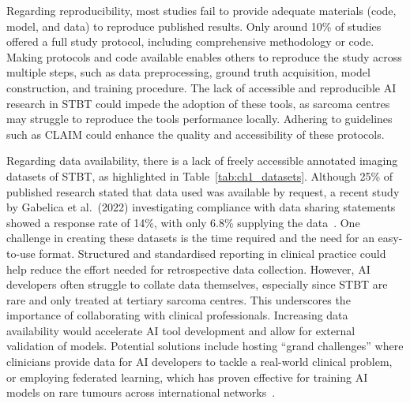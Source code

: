 Regarding reproducibility, most studies fail to provide adequate materials (code, model, and data) to reproduce published results.
Only around 10\% of studies offered a full study protocol, including comprehensive methodology or code.
Making protocols and code available enables others to reproduce the study across multiple steps, such as data preprocessing, ground truth acquisition, model construction, and training procedure.
The lack of accessible and reproducible AI research in STBT could impede the adoption of these tools, as sarcoma centres may struggle to reproduce the tools performance locally.
Adhering to guidelines such as CLAIM could enhance the quality and accessibility of these protocols.

Regarding data availability, there is a lack of freely accessible annotated imaging datasets of STBT, as highlighted in Table~\ref{tab:ch1_datasets}.
Although 25\% of published research stated that data used was available by request, a recent study by Gabelica et al.\ (2022) investigating compliance with data sharing statements showed a response rate of 14\%, with only 6.8\% supplying the data~\autocite{gabelica2022}.
One challenge in creating these datasets is the time required and the need for an easy-to-use format.
Structured and standardised reporting in clinical practice could help reduce the effort needed for retrospective data collection.
However, AI developers often struggle to collate data themselves, especially since STBT are rare and only treated at tertiary sarcoma centres.
This underscores the importance of collaborating with clinical professionals.
Increasing data availability would accelerate AI tool development and allow for external validation of models.
Potential solutions include hosting ``grand challenges'' where clinicians provide data for AI developers to tackle a real-world clinical problem, or employing federated learning, which has proven effective for training AI models on rare tumours across international networks~\autocite{luitse2024,grandchallenge2024,pati2022}.

